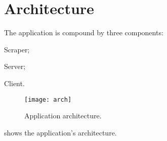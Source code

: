 \chapter{Architecture}\label{ch:arch}

The application is compound by three components:
\begin{enumerate*}[label=]
	\item Scraper;
	\item Server;
	\item Client.
\end{enumerate*}

\begin{figure}[p]
	\texttt{[image: arch]}
	\caption{Application architecture.}
	\label{fig:arch}
\end{figure}

 shows the application's architecture.







